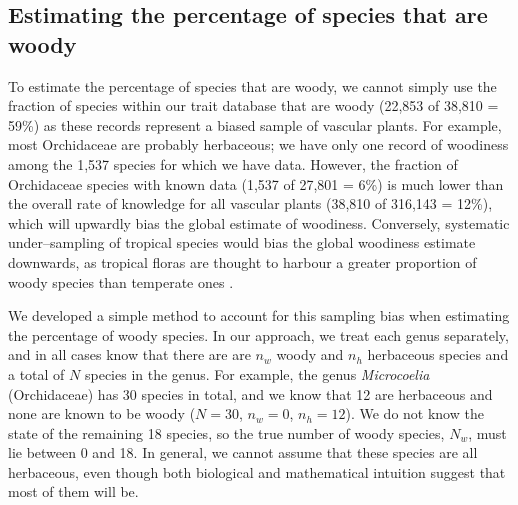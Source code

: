 \documentclass[a4paper,12pt]{article}
\begin{document}
\subsection{Estimating the percentage of species that are woody}

To estimate the percentage of species that are woody, we cannot simply
use the fraction of species within our trait database that are woody
(22,853 of 38,810 = 59\%) as these records represent a biased sample
of vascular plants.
For example, most Orchidaceae are probably herbaceous; we have only
one record of woodiness among the 1,537 species for which we have
data.
However, the fraction of Orchidaceae species with known data (1,537 of
27,801 = 6\%)
is much lower than the overall rate of knowledge for all vascular
plants (38,810 of 316,143 = 12\%), which will upwardly bias the global
estimate of woodiness.
Conversely, systematic under--sampling of tropical species would bias
the global woodiness estimate downwards, as tropical floras are
thought to harbour a greater proportion of woody species than
temperate ones \citep{Molesheihgt}.

We developed a simple method to account for this sampling bias when
estimating the percentage of woody species.  In our approach, we treat
each genus separately, and in all cases know that there are are $n_w$
woody and $n_h$ herbaceous species and a total of $N$ species in the genus.
%
For example, the genus \textit{Microcoelia} (Orchidaceae) has 30
species in total, and we know that 12 are herbaceous and none are
known to be woody ($N = 30$, $n_w = 0$, $n_h = 12$). We do not know
the state of the remaining 18 species, so the true number of woody
species, $N_w$, must lie between 0 and 18. In general, we cannot
assume that these species are all herbaceous, even though both
biological and mathematical intuition suggest that most of them will
be.
\end{document}

